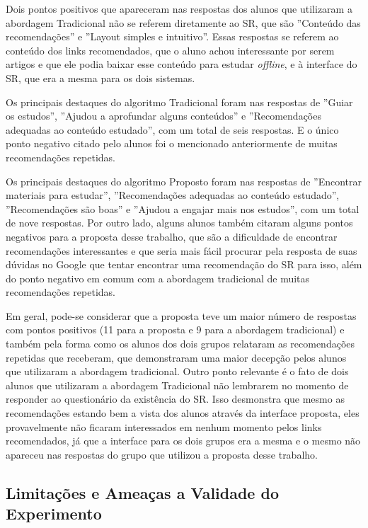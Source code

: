 Dois pontos positivos que apareceram nas respostas dos alunos que utilizaram a abordagem Tradicional não se referem diretamente
ao SR, que são ''Conteúdo das recomendações'' e ''Layout simples e intuitivo''. Essas respostas se referem ao conteúdo
dos links recomendados, que o aluno achou interessante por serem artigos e que ele podia baixar esse conteúdo para estudar
\textit{offline}, e à interface do SR, que era a mesma para os dois sistemas.

Os principais destaques do algoritmo Tradicional foram nas respostas de ''Guiar os estudos'',
''Ajudou a aprofundar alguns conteúdos'' e ''Recomendações adequadas ao conteúdo estudado'',
com um total de seis respostas. E o único ponto negativo citado pelo alunos foi o mencionado anteriormente de muitas recomendações
repetidas.

Os principais destaques do algoritmo Proposto foram nas respostas de ''Encontrar materiais para estudar'',
''Recomendações adequadas ao conteúdo estudado'', ''Recomendações são boas'' e ''Ajudou a engajar mais nos estudos'',
com um total de nove respostas. Por outro lado, alguns alunos também citaram alguns pontos negativos para a proposta desse
trabalho, que são a dificuldade de encontrar recomendações interessantes e que seria mais fácil procurar pela resposta de
suas dúvidas no Google que tentar encontrar uma recomendação do SR para isso, além do ponto negativo em comum com a abordagem
tradicional de muitas recomendações repetidas.

Em geral, pode-se considerar que a proposta teve um maior número de respostas com pontos positivos (11 para a proposta
e 9 para a abordagem tradicional) e também pela forma como os alunos dos dois grupos relataram as recomendações repetidas
que receberam, que demonstraram uma maior decepção pelos alunos que utilizaram a abordagem tradicional. Outro ponto
relevante é o fato de dois alunos que utilizaram a abordagem Tradicional não lembrarem no momento de responder ao
questionário da existência do SR. Isso desmonstra que mesmo as recomendações estando bem a vista dos alunos através da
interface proposta, eles provavelmente não ficaram interessados em nenhum momento pelos links recomendados, já que a
interface para os dois grupos era a mesma e o mesmo não apareceu nas respostas do grupo que utilizou a proposta desse
trabalho.

\subsection{Limitações e Ameaças a Validade do Experimento}\label{subsection:ameacas-a-validade}

